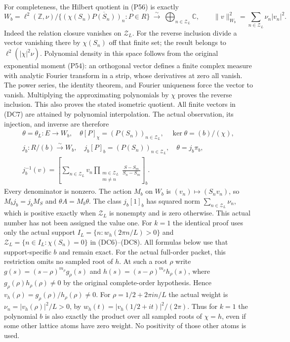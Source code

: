 \documentclass{article}
\begin{document}
For completeness, the Hilbert quotient in (P56) is exactly
\[
 W_b=\ell^2(\mathbb Z,\nu)/
       \overline{\{(\chi(S_n)P(S_n))_n:P\in R\}}
 \ \xrightarrow{\sim}\ 
 \bigoplus_{n\in\mathcal Z_L}\mathbb C,\qquad
 \|v\|_{W_b}^2=\sum_{n\in\mathcal Z_L}\nu_n|v_n|^2.
 \tag{DC7}
\]
Indeed the relation closure vanishes on $\mathcal Z_L$.
For the reverse inclusion divide a vector vanishing there by
$\chi(S_n)$ off that finite set; the result belongs to
$\ell^2(|\chi|^2\nu)$.  Polynomial density in this space follows
from the original exponential moment (P54): an orthogonal vector
defines a finite complex measure with analytic Fourier transform in a
strip, whose derivatives at zero all vanish.  The power series, the
identity theorem, and Fourier uniqueness force the vector to vanish.
Multiplying the approximating polynomials by $\chi$ proves the
reverse inclusion.  This also proves the stated isometric quotient.
All finite vectors in (DC7) are attained by polynomial interpolation.
The actual observation, its injection, and inverse are therefore
\[
 \begin{gathered}
 \theta=\theta_L:E\to W_b,\quad
 \theta[P]_\chi=(P(S_n))_{n\in\mathcal Z_L},\quad
 \ker\theta=(b)/(\chi),\\
 j_b:R/(b)\xrightarrow{\sim}W_b,\quad
 j_b[P]_b=(P(S_n))_{n\in\mathcal Z_L},\quad
 \theta=j_b\pi_b,\\
 j_b^{-1}(v)=
 \left[\sum_{n\in\mathcal Z_L}
 v_n\prod_{\substack{m\in\mathcal Z_L\\m\ne n}}
             \frac{S-S_m}{S_n-S_m}\right]_b .
 \end{gathered}
 \tag{DC8}
\]
Every denominator is nonzero.  The action $M_b$ on $W_b$ is
$(v_n)\mapsto(S_nv_n)$, so $M_bj_b=j_bM_S$ and
$\theta A=M_b\theta$.  The class $j_b[1]_b$ has squared norm
$\sum_{n\in\mathcal Z_L}\nu_n$, which is positive exactly when
$\mathcal Z_L$ is nonempty and is zero otherwise.  This actual
number has not been assigned the value one.
For $k=1$ the identical proof uses only the actual support
$I_L=\{n:w_h(2\pi n/L)>0\}$ and
$\mathcal Z_L=\{n\in I_L:\chi(S_n)=0\}$ in (DC6)--(DC8).
All formulas below use that support-specific $b$ and remain exact.
For the actual full-order packet, this restriction omits no sampled
root of $h$.  At such a root $\rho$ write
$g(s)=(s-\rho)^{m_\rho}g_\rho(s)$ and
$h(s)=(s-\rho)^{m_\rho}h_\rho(s)$, where
$g_\rho(\rho)h_\rho(\rho)\ne0$ by the original complete-order
hypothesis.  Hence
$v_h(\rho)=g_\rho(\rho)/h_\rho(\rho)\ne0$.
For $\rho=1/2+2\pi i n/L$ the actual weight is
$\nu_n=|v_h(\rho)|^2/L>0$, by
$w_h(t)=|v_h(1/2+it)|^2/(2\pi)$.
Thus for $k=1$ the polynomial $b$ is also exactly the product
over all sampled roots of $\chi=h$, even if some other lattice
atoms have zero weight.  No positivity of those other atoms
is used.
\end{document}
